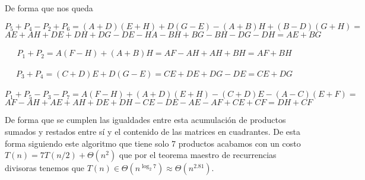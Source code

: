 De forma que nos queda


$$P_5 + P_4 - P_2 + P_6 = (A + D)(E + H) + D(G - E) - (A + B)H + (B - D)(G +
H) =$$
$$AE + AH + DE + DH + DG - DE - HA - BH + BG - BH - DG - DH = AE + BG$$\\
$$P_1 + P_2 = A(F - H) + (A + B)H = AF - AH + AH + BH = AF + BH$$\\
$$P_3 + P_4 = (C + D)E + D(G - E) = CE + DE + DG - DE = CE + DG$$\\
$$P_1 + P_5 - P_3 - P_7 = A(F - H) + (A + D)(E + H) - (C + D)E - (A - C)(E +
F) =$$
$$ AF - AH + AE + AH + DE + DH - CE - DE - AE - AF + CE + CF = DH + CF $$

De forma que se cumplen las igualdades entre esta acumulación de productos
sumados y restados entre sí y el contenido de las matrices en cuadrantes. De
esta forma siguiendo este algoritmo que tiene solo 7 productos acabamos con un
costo $T(n) = 7T(n/2) + \Theta(n^2)$ que por el teorema maestro de recurrencias
divisoras tenemos que $T(n) \in \Theta(n^{\log_2 7}) \approx \Theta(n^{2.81})$.
